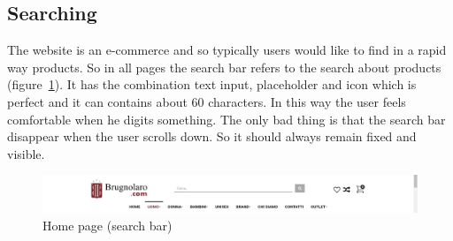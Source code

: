\subsection{Searching}
The website is an e-commerce and so typically users would like to find
in a rapid way products. So in all pages the search bar refers to the
search about products \mbox{(figure \ref{home-page-search}).} It has the combination text input, placeholder
and icon which is perfect and it can contains about 60 characters.
In this way the user feels comfortable when he digits something.
The only bad thing is that the search bar disappear when the user scrolls
down. So it should always remain fixed and visible.
\begin{figure}[!h] 
    \centering 
    \includegraphics[scale = 0.29]{images/search_bar.png} 
    \caption{Home page (search bar)}
    \label{home-page-search}
\end{figure}